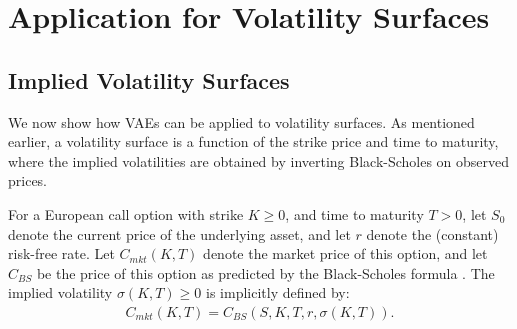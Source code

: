 \documentclass[12pt]{article}
\newcommand{\posterior}{q_\phi(z|x)}
\begin{document}

\section{Application for Volatility Surfaces}
\subsection{Implied Volatility Surfaces}
We now show how VAEs can be applied to volatility surfaces. As mentioned earlier, a volatility surface is a function of the strike price and time to maturity,  where the implied volatilities are obtained by inverting Black-Scholes on observed prices. 

For a European call option with strike $K \geq 0$, and time to maturity $T > 0$, let $S_0$ denote the current price of the underlying asset, and let $r$ denote the (constant) risk-free rate. Let $C_{mkt}(K, T)$ denote the market price of this option, and let $C_{BS}$ be the price of this option as predicted by the Black-Scholes formula \citep{blackscholes}. The implied volatility $\sigma(K, T) \geq 0$ is implicitly defined by:
\begin{align}\label{eq:black-scholes}
  C_{mkt}(K,T) = C_{BS}\left(S, K,T, r, \sigma(K,T)\right).
\end{align}
\end{document}
